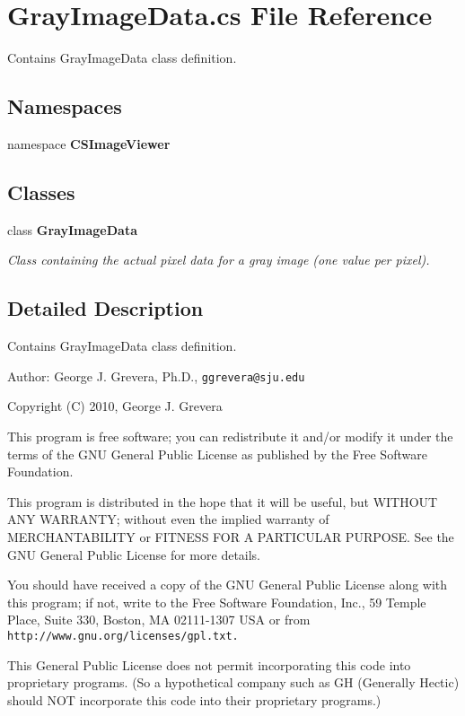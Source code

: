 \section{Gray\-Image\-Data.cs File Reference}
\label{_gray_image_data_8cs}
Contains Gray\-Image\-Data class definition. 

\subsection*{Namespaces}
\begin{CompactItemize}
\item 
namespace {\bf CSImage\-Viewer}
\end{CompactItemize}
\subsection*{Classes}
\begin{CompactItemize}
\item 
class {\bf Gray\-Image\-Data}
\begin{CompactList}\small\item\em Class containing the actual pixel data for a gray image (one value per pixel). \item\end{CompactList}\end{CompactItemize}


\subsection{Detailed Description}
Contains Gray\-Image\-Data class definition. 

\begin{Desc}
\item[Author:]George J. Grevera, Ph.D., {\tt ggrevera@sju.edu}\end{Desc}
Copyright (C) 2010, George J. Grevera

This program is free software; you can redistribute it and/or modify it under the terms of the GNU General Public License as published by the Free Software Foundation.

This program is distributed in the hope that it will be useful, but WITHOUT ANY WARRANTY; without even the implied warranty of MERCHANTABILITY or FITNESS FOR A PARTICULAR PURPOSE. See the GNU General Public License for more details.

You should have received a copy of the GNU General Public License along with this program; if not, write to the Free Software Foundation, Inc., 59 Temple Place, Suite 330, Boston, MA 02111-1307 USA or from {\tt http://www.gnu.org/licenses/gpl.txt.}

This General Public License does not permit incorporating this code into proprietary programs. (So a hypothetical company such as GH (Generally Hectic) should NOT incorporate this code into their proprietary programs.) 